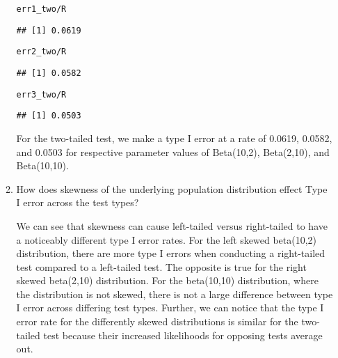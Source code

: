\documentclass{article}\usepackage[]{graphicx}\usepackage[]{xcolor}
\makeatletter
\newcommand{\hlopt}[1]{\textcolor[rgb]{0,0,0}{#1}}%
\newcommand{\hldef}[1]{\textcolor[rgb]{0.345,0.345,0.345}{#1}}%
\newenvironment{kframe}{%
 \def\at@end@of@kframe{}%
 \ifinner\ifhmode%
  \def\at@end@of@kframe{\end{minipage}}%
  \begin{minipage}{\columnwidth}%
 \fi\fi%
 \def\FrameCommand##1{\hskip\@totalleftmargin \hskip-\fboxsep
 \colorbox{shadecolor}{##1}\hskip-\fboxsep
     \hskip-\linewidth \hskip-\@totalleftmargin \hskip\columnwidth}%
 \MakeFramed {\advance\hsize-\width
   \@totalleftmargin\z@ \linewidth\hsize
   \@setminipage}}%
 {\par\unskip\endMakeFramed%
 \at@end@of@kframe}
\newenvironment{knitrout}{}{} %
\makeatother
\begin{document}
\begin{enumerate}
\begin{enumerate}
\begin{knitrout}\scriptsize
{}\color{fgcolor}\begin{kframe}
\begin{alltt}
\hldef{err1_two}\hlopt{/}\hldef{R}
\end{alltt}
\begin{verbatim}
## [1] 0.0619
\end{verbatim}
\begin{alltt}
\hldef{err2_two}\hlopt{/}\hldef{R}
\end{alltt}
\begin{verbatim}
## [1] 0.0582
\end{verbatim}
\begin{alltt}
\hldef{err3_two}\hlopt{/}\hldef{R}
\end{alltt}
\begin{verbatim}
## [1] 0.0503
\end{verbatim}
\end{kframe}
\end{knitrout}
     For the two-tailed test, we make a type I error at a rate of 0.0619, 0.0582, and 0.0503 for respective parameter values of Beta(10,2), Beta(2,10), and Beta(10,10).
     
    \item How does skewness of the underlying population distribution effect
    Type I error across the test types?
    
    We can see that skewness can cause left-tailed versus right-tailed to have a noticeably different type I error rates. For the left skewed beta(10,2) distribution, there are more type I errors when conducting a right-tailed test compared to a left-tailed test. The opposite is true for the right skewed beta(2,10) distribution. For the beta(10,10) distribution, where the distribution is not skewed, there is not a large difference between type I error across differing test types. Further, we can notice that the type I error rate for the differently skewed distributions is similar for the two-tailed test because their increased likelihoods for opposing tests average out.
    
  \end{enumerate}
\end{enumerate}

\end{document}
